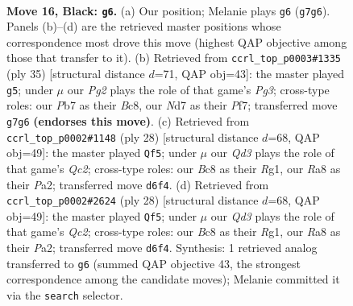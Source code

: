 \documentclass[11pt]{article}
\begin{document}
\clearpage

\begin{figure}[p]\centering
\begin{subfigure}{0.46\textwidth}\centering
\resizebox{\linewidth}{!}{%
\newchessgame
\chessboard[
  setfen={r1b1k2r/pp1n2pp/2pq4/3p2p1/3P4/2NBP3/PP3PPP/2RQR1K1 b k - 7 16},
  showmover=false,
  pgfstyle=straightmove, color=movearrow, markmove={g7-g6}
]}
\caption{}
\end{subfigure}\hfill
\begin{subfigure}{0.46\textwidth}\centering
\resizebox{\linewidth}{!}{%
\newchessgame
\chessboard[
  setfen={r1b1k2r/p3qpb1/1pp3pp/8/3pPB2/3P1N1P/PPP3P1/R1Q2RK1 b kq - 2 18},
  showmover=false,
  pgfstyle=straightmove, color=movearrow, markmove={g6-g5}
]}
\caption{}
\end{subfigure}
\\[4pt]
\begin{subfigure}{0.46\textwidth}\centering
\resizebox{\linewidth}{!}{%
\newchessgame
\chessboard[
  setfen={r2q1rk1/pp3ppp/1n1P4/3p2P1/8/2N1Pb2/PPQB1P1P/R3K1R1 w Q - 2 15},
  showmover=false,
  pgfstyle=straightmove, color=movearrow, markmove={c2-f5}
]}
\caption{}
\end{subfigure}\hfill
\begin{subfigure}{0.46\textwidth}\centering
\resizebox{\linewidth}{!}{%
\newchessgame
\chessboard[
  setfen={r2q1rk1/pp3ppp/1n1P4/3p2P1/8/2N1Pb2/PPQB1P1P/R3K1R1 w Q - 2 15},
  showmover=false,
  pgfstyle=straightmove, color=movearrow, markmove={c2-f5}
]}
\caption{}
\end{subfigure}
\caption{\textbf{Move 16, Black: \texttt{g6}.} (a) Our position; Melanie plays \texttt{g6} (\texttt{g7g6}). Panels (b)--(d) are the retrieved master positions whose correspondence most drove this move (highest QAP objective among those that transfer to it). (b) Retrieved from \texttt{ccrl\_top\_p0003\#1335} (ply 35) [structural distance $d$=71, QAP obj=43]: the master played \texttt{g5}; under $\mu$ our \emph{Pg2} plays the role of that game's \emph{Pg3}; cross-type roles: our \emph{P}b7 as their \emph{B}c8, our \emph{N}d7 as their \emph{P}f7; transferred move \texttt{g7g6} \textbf{(endorses this move)}. (c) Retrieved from \texttt{ccrl\_top\_p0002\#1148} (ply 28) [structural distance $d$=68, QAP obj=49]: the master played \texttt{Qf5}; under $\mu$ our \emph{Qd3} plays the role of that game's \emph{Qc2}; cross-type roles: our \emph{B}c8 as their \emph{R}g1, our \emph{R}a8 as their \emph{P}a2; transferred move \texttt{d6f4}. (d) Retrieved from \texttt{ccrl\_top\_p0002\#2624} (ply 28) [structural distance $d$=68, QAP obj=49]: the master played \texttt{Qf5}; under $\mu$ our \emph{Qd3} plays the role of that game's \emph{Qc2}; cross-type roles: our \emph{B}c8 as their \emph{R}g1, our \emph{R}a8 as their \emph{P}a2; transferred move \texttt{d6f4}. Synthesis: 1 retrieved analog transferred to \texttt{g6} (summed QAP objective 43, the strongest correspondence among the candidate moves); Melanie committed it via the \texttt{search} selector.}
\label{fig:thought-m31}
\end{figure}
\end{document}
